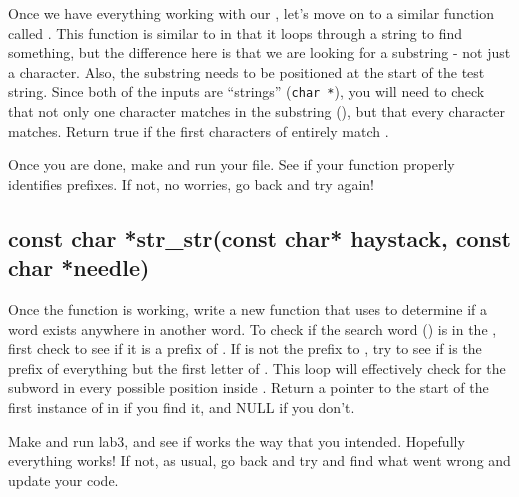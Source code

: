 \documentclass{tufte-handout}
\begin{document}
Once we have everything working with our , let's
move on to a similar function called
. This
function is similar to  in that it loops through
a string to find something, but the difference here is that we are looking for
a substring - not just a character. Also, the substring needs to be positioned
at the start of the test string. Since both of the inputs are ``strings''
(\verb!char *!), you will need to check that not only one character matches in
the substring (), but that every character matches. Return true
if the first characters of  entirely match .

Once you are done, make and run your file. See if your function properly identifies prefixes. If not, no worries, go back and try again!

\subsection{{const char *str\_str(const char* haystack, const
char *needle)}}

Once the function  is working, write a new
function  that uses  to
determine if a word exists anywhere in another word. To check if the search
word () is in the , first check to see if it
is a prefix of . If  is not the prefix to
, try to see if  is the prefix of everything
but the first letter of . This loop will effectively check
for the subword  in every possible position inside
. Return a pointer to the start of the first instance of
 in  if you find it, and NULL if you don't.

Make and run lab3, and see if  works the way that you intended.  Hopefully everything works!  If not, as usual, go back and try and find what went wrong and update your code.

\end{document}
